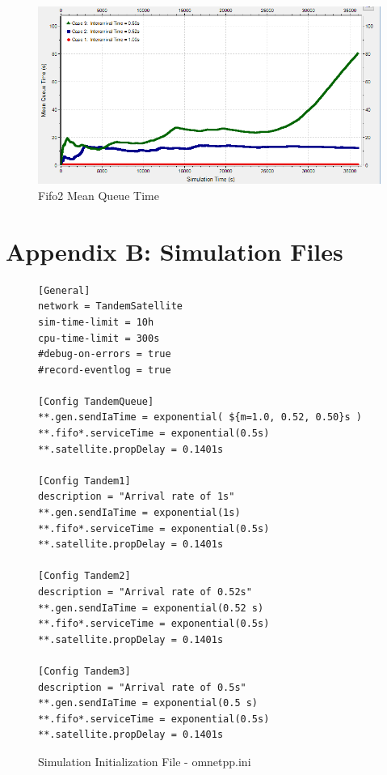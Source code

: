 \documentclass{article}
\begin{document}
\begin{figure}[h!]
	\begin{center}
	\includegraphics[scale=0.75]{Images/Fifo2_QueueTime.PNG}
	\vspace{-.25cm}
	\caption{Fifo2 Mean Queue Time}
	\label{fifo2_qtime}
	\end{center}
\end{figure}

\newpage
\clearpage
\section*{Appendix B:  Simulation Files}

\begin{figure}[h!]
\begin{lstlisting}
[General]
network = TandemSatellite
sim-time-limit = 10h
cpu-time-limit = 300s
#debug-on-errors = true
#record-eventlog = true

[Config TandemQueue]
**.gen.sendIaTime = exponential( ${m=1.0, 0.52, 0.50}s )
**.fifo*.serviceTime = exponential(0.5s)
**.satellite.propDelay = 0.1401s

[Config Tandem1]
description = "Arrival rate of 1s"
**.gen.sendIaTime = exponential(1s)
**.fifo*.serviceTime = exponential(0.5s)
**.satellite.propDelay = 0.1401s

[Config Tandem2]
description = "Arrival rate of 0.52s"
**.gen.sendIaTime = exponential(0.52 s)
**.fifo*.serviceTime = exponential(0.5s)
**.satellite.propDelay = 0.1401s

[Config Tandem3]
description = "Arrival rate of 0.5s"
**.gen.sendIaTime = exponential(0.5 s)
**.fifo*.serviceTime = exponential(0.5s)
**.satellite.propDelay = 0.1401s
\end{lstlisting}
\vspace{-1cm}
\caption*{Simulation Initialization File - omnetpp.ini}
\end{figure}
\end{document}
